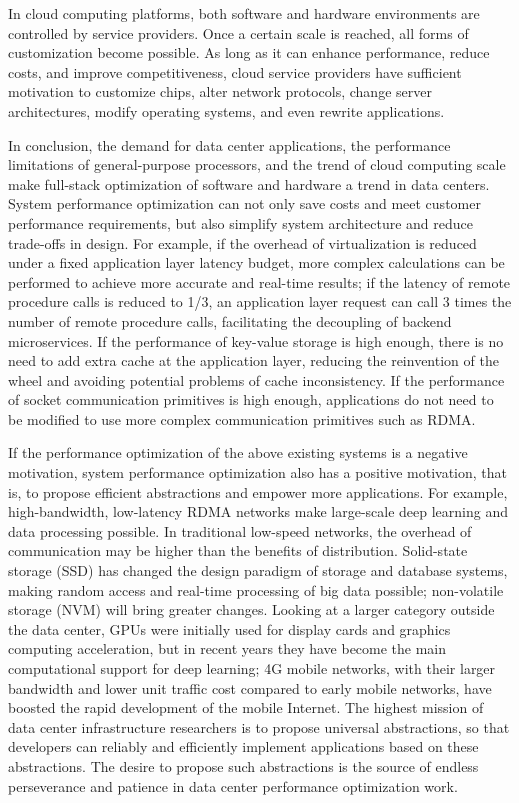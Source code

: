 In cloud computing platforms, both software and hardware environments are controlled by service providers. Once a certain scale is reached, all forms of customization become possible. As long as it can enhance performance, reduce costs, and improve competitiveness, cloud service providers have sufficient motivation to customize chips, alter network protocols, change server architectures, modify operating systems, and even rewrite applications.

In conclusion, the demand for data center applications, the performance limitations of general-purpose processors, and the trend of cloud computing scale make full-stack optimization of software and hardware a trend in data centers. System performance optimization can not only save costs and meet customer performance requirements, but also simplify system architecture and reduce trade-offs in design. For example, if the overhead of virtualization is reduced under a fixed application layer latency budget, more complex calculations can be performed to achieve more accurate and real-time results; if the latency of remote procedure calls is reduced to 1/3, an application layer request can call 3 times the number of remote procedure calls, facilitating the decoupling of backend microservices. If the performance of key-value storage is high enough, there is no need to add extra cache at the application layer, reducing the reinvention of the wheel and avoiding potential problems of cache inconsistency. If the performance of socket communication primitives is high enough, applications do not need to be modified to use more complex communication primitives such as RDMA.

If the performance optimization of the above existing systems is a negative motivation, system performance optimization also has a positive motivation, that is, to propose efficient abstractions and empower more applications. For example, high-bandwidth, low-latency RDMA networks make large-scale deep learning and data processing possible. In traditional low-speed networks, the overhead of communication may be higher than the benefits of distribution. Solid-state storage (SSD) has changed the design paradigm of storage and database systems, making random access and real-time processing of big data possible; non-volatile storage (NVM) will bring greater changes. Looking at a larger category outside the data center, GPUs were initially used for display cards and graphics computing acceleration, but in recent years they have become the main computational support for deep learning; 4G mobile networks, with their larger bandwidth and lower unit traffic cost compared to early mobile networks, have boosted the rapid development of the mobile Internet. The highest mission of data center infrastructure researchers is to propose universal abstractions, so that developers can reliably and efficiently implement applications based on these abstractions. The desire to propose such abstractions is the source of endless perseverance and patience in data center performance optimization work.

